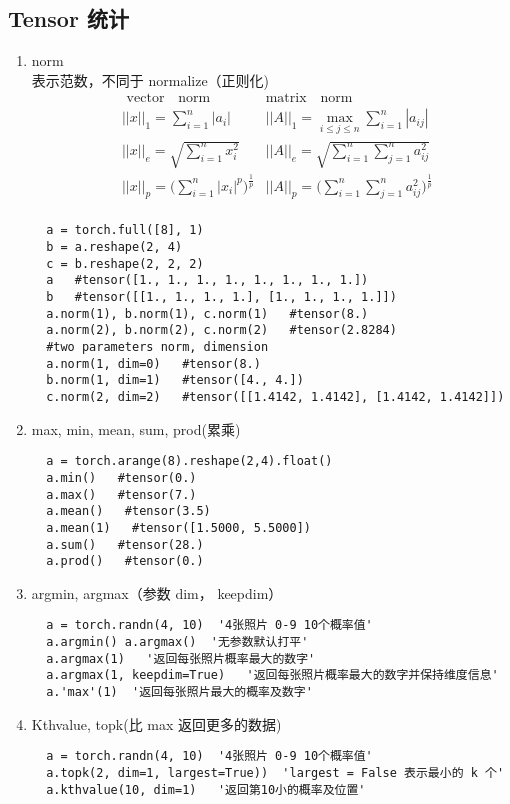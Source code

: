 \subsection{Tensor 统计}
\begin{enumerate}
  \item norm\\
  表示范数，不同于 normalize（正则化)
  \begin{align*}
  &\text{~vector ~~norm}   &\text{matrix~~ norm~~~~~~~~~~}\\
  &||x||_1 = \sum_{i=1}^{n}|a_i| &||A||_1=\max\limits_{i\le j \le n}\sum_{i=1}^{n}|a_{ij}|\\
  &||x||_e = \sqrt{\sum_{i=1}^{n}x_i^2}   &||A||_e=\sqrt{\sum_{i=1}^{n}\sum_{j=1}^{n}a_{ij}^2}\\
  &||x||_p = \Big(\sum_{i=1}^{n}|x_i|^p\Big)^{\frac{1}{p}}  &||A||_p=\Big(\sum_{i=1}^{n}\sum_{j=1}^{n}a_{ij}^2\Big)^{\frac{1}{p}}\\
  \end{align*}
  \begin{lstlisting}
  a = torch.full([8], 1)
  b = a.reshape(2, 4)
  c = b.reshape(2, 2, 2)
  a   #tensor([1., 1., 1., 1., 1., 1., 1., 1.])
  b   #tensor([[1., 1., 1., 1.], [1., 1., 1., 1.]])
  a.norm(1), b.norm(1), c.norm(1)   #tensor(8.)
  a.norm(2), b.norm(2), c.norm(2)   #tensor(2.8284)
  #two parameters norm, dimension
  a.norm(1, dim=0)   #tensor(8.)
  b.norm(1, dim=1)   #tensor([4., 4.])
  c.norm(2, dim=2)   #tensor([[1.4142, 1.4142], [1.4142, 1.4142]])
  \end{lstlisting}

  \item max, min, mean, sum, prod(累乘)
  \begin{lstlisting}
  a = torch.arange(8).reshape(2,4).float()
  a.min()   #tensor(0.)
  a.max()   #tensor(7.)
  a.mean()   #tensor(3.5)
  a.mean(1)   #tensor([1.5000, 5.5000])
  a.sum()   #tensor(28.)
  a.prod()   #tensor(0.)
  \end{lstlisting}

  \item  argmin, argmax（参数 dim， keepdim）
  \begin{lstlisting}
  a = torch.randn(4, 10)  '4张照片 0-9 10个概率值'
  a.argmin() a.argmax()  '无参数默认打平'
  a.argmax(1)   '返回每张照片概率最大的数字'
  a.argmax(1, keepdim=True)   '返回每张照片概率最大的数字并保持维度信息'
  a.'max'(1)  '返回每张照片最大的概率及数字'
  \end{lstlisting}

  \item Kthvalue, topk(比 max 返回更多的数据)
  \begin{lstlisting}
  a = torch.randn(4, 10)  '4张照片 0-9 10个概率值'
  a.topk(2, dim=1, largest=True))  'largest = False 表示最小的 k 个'
  a.kthvalue(10, dim=1)   '返回第10小的概率及位置'
  \end{lstlisting}


\end{enumerate}
